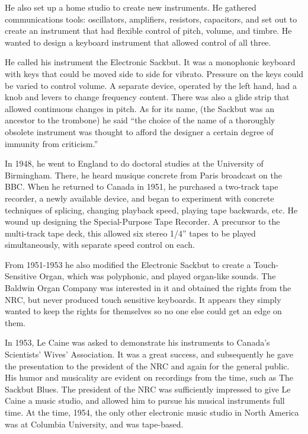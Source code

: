 He also set up a home studio to create new instruments. He gathered communications tools: oscillators, amplifiers, resistors, capacitors, and set out to create an instrument that had flexible control of pitch, volume, and timbre. He wanted to design a keyboard instrument that allowed control of all three.

He called his instrument the Electronic Sackbut. It was a monophonic keyboard with keys that could be moved side to side for vibrato. Pressure on the keys could be varied to control volume. A separate device, operated by the left hand, had a knob and levers to change frequency content. There was also a glide strip that allowed continuous changes in pitch. As for its name, (the Sackbut was an ancestor to the trombone) he said ``the choice of the name of a thoroughly obsolete instrument was thought to afford the designer a certain degree of immunity from criticism.''

In 1948, he went to England to do doctoral studies at the University of Birmingham. There, he heard musique concrete from Paris broadcast on the BBC. When he returned to Canada in 1951, he purchased a two-track tape recorder, a newly available device, and began to experiment with concrete techniques of splicing, changing playback speed, playing tape backwards, etc. He wound up designing the Special-Purpose Tape Recorder. A precursor to the multi-track tape deck, this allowed six stereo 1/4'' tapes to be played simultaneously, with separate speed control on each.

From 1951-1953 he also modified the Electronic Sackbut to create a Touch-Sensitive Organ, which was polyphonic, and played organ-like sounds. The Baldwin Organ Company was interested in it and obtained the rights from the NRC, but never produced touch sensitive keyboards. It appears they simply wanted to keep the rights for themselves so no one else could get an edge on them.

In 1953, Le Caine was asked to demonstrate his instruments to Canada's Scientists' Wives' Association. It was a great success, and subsequently he gave the presentation to the president of the NRC and again for the general public. His humor and musicality are evident on recordings from the time, such as The Sackbut Blues. The president of the NRC was sufficiently impressed to give Le Caine a music studio, and allowed him to pursue his musical instruments full time. At the time, 1954, the only other electronic music studio in North America was at Columbia University, and was tape-based.

